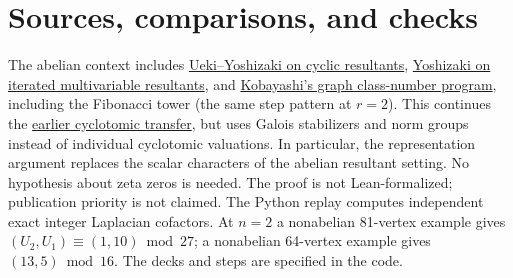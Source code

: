 \documentclass[11pt]{article}
\begin{document}
\section*{Sources, comparisons, and checks}
The abelian context includes
\href{https://arxiv.org/abs/2210.06182}{Ueki--Yoshizaki on cyclic resultants},
\href{https://arxiv.org/abs/2503.06194}{Yoshizaki on iterated multivariable resultants},
and \href{https://imath.kyiv.ua/~topology/conf/agma2025/abstracts/texts/kobayashi/kobayashi.pdf}{Kobayashi's graph class-number program},
including the Fibonacci tower (the same step pattern at \(r=2\)).
This continues the \href{https://chatgpt.com/c/6b07d086-1ef0-83e8-9354-9bbcf6afcaf3?messageId=88092bdb-6383-595f-a45a-d402786a8c09}{earlier cyclotomic transfer},
but uses Galois stabilizers and norm groups instead of individual
cyclotomic valuations. In particular, the representation argument
replaces the scalar characters of the abelian resultant setting. No hypothesis about zeta zeros is needed.
The proof is not Lean-formalized; publication priority is not claimed.
The Python replay computes independent exact integer Laplacian
cofactors. At \(n=2\) a nonabelian 81-vertex example gives
\((U_2,U_1)\equiv(1,10)\bmod27\); a nonabelian 64-vertex example
gives \((13,5)\bmod16\). The decks and steps are specified in the code.
\end{document}
